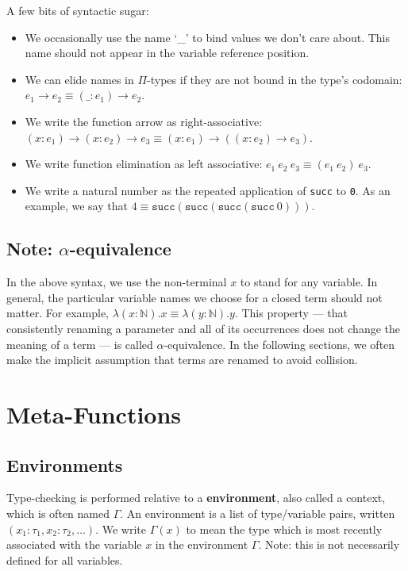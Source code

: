 \documentclass[12pt]{article}
\begin{document}
A few bits of syntactic sugar:
\begin{itemize}
\item We occasionally use the name `\_' to bind values we don't care about. This name should not appear in the variable reference position.
\item We can elide names in \(\Pi\)-types if they are not bound in the type's codomain: \(e_1 \rightarrow e_2 \equiv (\_ : e_1) \rightarrow e_2\).
\item We write the function arrow as right-associative: \((x : e_1) \rightarrow (x : e_2) \rightarrow e_3 \equiv (x : e_1) \rightarrow ((x : e_2) \rightarrow e_3)\).
\item We write function elimination as left associative: \(e_1\ e_2\ e_3 \equiv (e_1\ e_2)\ e_3\).
\item We write a natural number as the repeated application of \texttt{succ} to \texttt{0}. As an example, we say that \(4 \equiv \mathtt{succ}(\mathtt{succ} (\mathtt{succ} (\mathtt{succ}\ 0)))\).
\end{itemize}

\subsection*{Note: \(\alpha\)-equivalence}
\label{sec:org01212bf}

In the above syntax, we use the non-terminal \(x\) to stand for any variable. In general, the particular variable names we choose for a closed term should not matter. For example, \(\lambda (x : \mathbb{N}). x \equiv \lambda (y : \mathbb{N}). y\). This property --- that consistently renaming a parameter and all of its occurrences does not change the meaning of a term --- is called \(\alpha\)-equivalence. In the following sections, we often make the implicit assumption that terms are renamed to avoid collision.

\section*{Meta-Functions}
\label{sec:org64db96c}

\subsection*{Environments}
\label{sec:org0568858}

Type-checking is performed relative to a \textbf{environment}, also called a context, which is often named \(\Gamma\). An environment is a list of type/variable pairs, written \((x_1 : \tau_1 , x_2 : \tau_2, \dots)\). We write \(\Gamma(x)\) to mean the type which is most recently associated with the variable \(x\) in the environment \(\Gamma\). Note: this is not necessarily defined for all variables.
\end{document}
